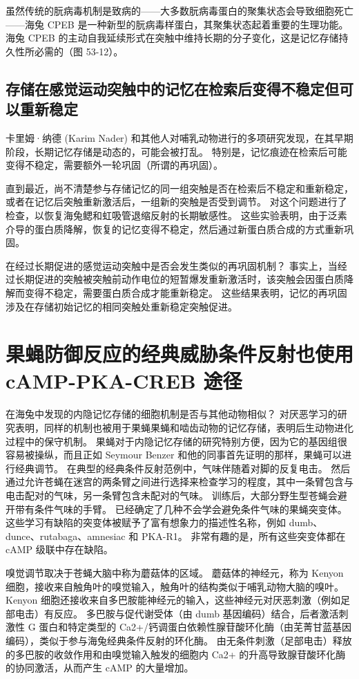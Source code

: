 虽然传统的朊病毒机制是致病的——大多数朊病毒蛋白的聚集状态会导致细胞死亡——海兔 CPEB 是一种新型的朊病毒样蛋白，其聚集状态起着重要的生理功能。 海兔 CPEB 的主动自我延续形式在突触中维持长期的分子变化，这是记忆存储持久性所必需的（图 53-12）。

\subsection{存储在感觉运动突触中的记忆在检索后变得不稳定但可以重新稳定}
卡里姆·纳德 (Karim Nader) 和其他人对哺乳动物进行的多项研究发现，在其早期阶段，长期记忆存储是动态的，可能会被打乱。 特别是，记忆痕迹在检索后可能变得不稳定，需要额外一轮巩固（所谓的再巩固）。

直到最近，尚不清楚参与存储记忆的同一组突触是否在检索后不稳定和重新稳定，或者在记忆后突触重新激活后，一组新的突触是否受到调节。 对这个问题进行了检查，以恢复海兔鳃和虹吸管退缩反射的长期敏感性。 这些实验表明，由于泛素介导的蛋白质降解，恢复的记忆变得不稳定，然后通过新蛋白质合成的方式重新巩固。

在经过长期促进的感觉运动突触中是否会发生类似的再巩固机制？ 事实上，当经过长期促进的突触被突触前动作电位的短暂爆发重新激活时，该突触会因蛋白质降解而变得不稳定，需要蛋白质合成才能重新稳定。 这些结果表明，记忆的再巩固涉及在存储初始记忆的相同突触处重新稳定突触促进。


\section{果蝇防御反应的经典威胁条件反射也使用 cAMP-PKA-CREB 途径}
在海兔中发现的内隐记忆存储的细胞机制是否与其他动物相似？ 对厌恶学习的研究表明，同样的机制也被用于果蝇果蝇和啮齿动物的记忆存储，表明后生动物进化过程中的保守机制。 果蝇对于内隐记忆存储的研究特别方便，因为它的基因组很容易被操纵，而且正如 Seymour Benzer 和他的同事首先证明的那样，果蝇可以进行经典调节。 在典型的经典条件反射范例中，气味伴随着对脚的反复电击。 然后通过允许苍蝇在迷宫的两条臂之间进行选择来检查学习的程度，其中一条臂包含与电击配对的气味，另一条臂包含未配对的气味。 训练后，大部分野生型苍蝇会避开带有条件气味的手臂。 已经确定了几种不会学会避免条件气味的果蝇突变体。 这些学习有缺陷的突变体被赋予了富有想象力的描述性名称，例如 dumb、dunce、rutabaga、amnesiac 和 PKA-R1。 非常有趣的是，所有这些突变体都在 cAMP 级联中存在缺陷。

嗅觉调节取决于苍蝇大脑中称为蘑菇体的区域。 蘑菇体的神经元，称为 Kenyon 细胞，接收来自触角叶的嗅觉输入，触角叶的结构类似于哺乳动物大脑的嗅叶。 Kenyon 细胞还接收来自多巴胺能神经元的输入，这些神经元对厌恶刺激（例如足部电击）有反应。 多巴胺与促代谢受体（由 dumb 基因编码）结合，后者激活刺激性 G 蛋白和特定类型的 Ca2+/钙调蛋白依赖性腺苷酸环化酶（由芜菁甘蓝基因编码），类似于参与海兔经典条件反射的环化酶。 由无条件刺激（足部电击）释放的多巴胺的收敛作用和由嗅觉输入触发的细胞内 Ca2+ 的升高导致腺苷酸环化酶的协同激活，从而产生 cAMP 的大量增加。

